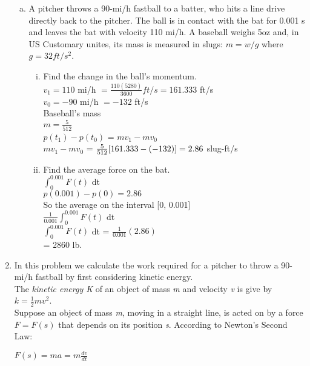 \documentclass[paper=a4, fontsize=11pt]{scrartcl}
\numberwithin{equation}{section}
\numberwithin{figure}{section}
\numberwithin{table}{section}
\begin{document}
\begin{enumerate}[1.]
		\begin {enumerate}[(b)]
			\item  A pitcher throws a 90-mi/h fastball to a batter, who hits a line drive directly back to the pitcher. The ball is in contact with the bat for 0.001 s and leaves the bat with velocity 110 mi/h. A baseball weighs 5oz 			and, in US Customary unites, its mass is measured in slugs: $m = w/g$ where $g = 32 ft/s^{2}$. 
				\begin{enumerate}[(i)]
					\item Find the change in the ball's momentum. \\
					$v_{1} = 110$ mi/h $ = \frac{110(5280)}{3600} ft/s = 161.333$ ft/s \\
					$v_{0} = -90$ mi/h $ = -132 $ ft/s \\
					Baseball's mass \\
					$m = \frac{5}{512}$ \\
					$p(t_{1}) - p(t_{0})$ = $mv_{1} - mv_{0}$\\
					$mv_{1} - mv_{0}$ = $\frac{5}{512}[161.333 - (-132)] \\
					= 2.86$ slug-ft/s\\
					\item Find the average force on the bat. \\
					$\int_{0}^{0.001}F(t)$ dt \\
					$p(0.001) - p(0) = 2.86$\\
					So the average on the interval [0, 0.001] \\
					$\frac{1}{0.001} \int_{0}^{0.001}F(t)$ dt \\
					$\int_{0}^{0.001}F(t)$ dt = $\frac{1}{0.001}(2.86)$\\
					= 2860 lb.
				\end{enumerate}
		\end{enumerate}
	\item In this problem we calculate the work required for a pitcher to throw a 90-mi/h fastball by first considering kinetic energy. \\
	\hspace{10mm} The \textit{kinetic energy K} of an object of mass \textit{m} and velocity \textit{v} is give by $k = \frac{1}{2}mv^2$. \\ Suppose an object of mass \textit{m}, moving in a straight line, is acted on by a force $F = F(s)$ that depends on its position \textit{s}. According to Newton's Second Law:
	\begin{center} $F(s) = ma = m \frac{dv}{dt}$ \\

\end{center}
\end{enumerate}
\end{document}

